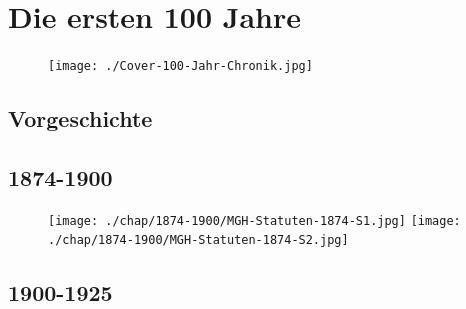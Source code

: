\documentclass[openany]{book}
\begin{document}
\chapter{Die ersten 100 Jahre}
\begin{figure}[h]
    \texttt{[image: ./Cover-100-Jahr-Chronik.jpg]}
\end{figure}
\section{Vorgeschichte}

\clearpage


\section{1874-1900}

\begin{figure}[h]
    \texttt{[image: ./chap/1874-1900/MGH-Statuten-1874-S1.jpg]}
    \texttt{[image: ./chap/1874-1900/MGH-Statuten-1874-S2.jpg]}
    \label{fig:Statuten-1874}
\end{figure}


\clearpage

\section{1900-1925}
\end{document}

